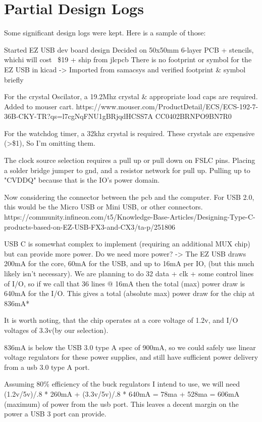 \section{Partial Design Logs}
Some significant design logs were kept. Here is a sample of those:

Started EZ USB dev board design
Decided on 50x50mm 6-layer PCB + stencils, whichi will cost ~\$19 + ship from jlcpcb
There is no footprint or symbol for the EZ USB in kicad -> Imported from samacsys and verified footprint \& symbol briefly

For the crystal Oscilator, a 19.2Mhz crystal \& appropriate load caps are required. Added to mouser cart.
https://www.mouser.com/ProductDetail/ECS/ECS-192-7-36B-CKY-TR?qs=l7cgNqFNU1gBRjqdHCSS7A%
CC0402BRNPO9BN7R0

For the watchdog timer, a 32khz crystal is required. These crystals are expensive (>\$1), So I'm omitting them.

The clock source selection requires a pull up or pull down on FSLC pins. Placing a solder bridge jumper to gnd, and a resistor network for pull up.
Pulling up to "CVDDQ" because that is the IO's power domain.

Now considering the connector between the pcb and the computer. For USB 2.0, this would be the Micro USB or Mini USB, or other connectors.
https://community.infineon.com/t5/Knowledge-Base-Articles/Designing-Type-C-products-based-on-EZ-USB-FX3-and-CX3/ta-p/251806


USB C is somewhat complex to implement (requiring an additional MUX chip) but can provide more power.
Do we need more power? -> The EZ USB draws 200mA for the core, 60mA for the USB, and up to 16mA per IO, (but this much likely isn't necessary).
We are planning to do 32 data + clk + some control lines of I/O, so if we call that 36 lines @ 16mA then the total (max) power draw is 640mA for the I/O.
This gives a total (absolute max) power draw for the chip at 836mA*

It is worth noting, that the chip operates at a core voltage of 1.2v, and I/O voltages of 3.3v(by our selection).

836mA is below the USB 3.0 type A spec of 900mA, so we could safely use linear voltage regulators for these power supplies, and still have sufficient power delivery from a usb 3.0 type A port.

Assuming 80\% efficiency of the buck regulators I intend to use, we will need (1.2v/5v)/.8 * 260mA + (3.3v/5v)/.8 * 640mA = 78ma + 528ma = 606mA (maximum) of power from the usb port. This leaves a decent margin on the power a USB 3 port can provide.


